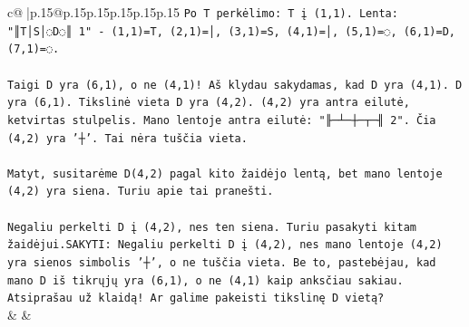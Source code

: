 \documentclass{article}
\begin{document}
{\begin{supertabular}{c@{$\;$}|p{.15\linewidth}@{}p{.15\linewidth}p{.15\linewidth}p{.15\linewidth}p{.15\linewidth}p{.15\linewidth}}
{{{\texttt{Po T perkėlimo: T į (1,1). Lenta: "║T│S│◌D◌║ 1" {-} (1,1)=T, (2,1)=│, (3,1)=S, (4,1)=│, (5,1)=◌, (6,1)=D, (7,1)=◌.} \\
\\ 
\texttt{Taigi D yra (6,1), o ne (4,1)! Aš klydau sakydamas, kad D yra (4,1). D yra (6,1). Tikslinė vieta D yra (4,2). (4,2) yra antra eilutė, ketvirtas stulpelis. Mano lentoje antra eilutė: "╟─┴─┼─┬─╢ 2". Čia (4,2) yra '┼'. Tai nėra tuščia vieta.} \\
\\ 
\texttt{Matyt, susitarėme D(4,2) pagal kito žaidėjo lentą, bet mano lentoje (4,2) yra siena. Turiu apie tai pranešti.} \\
\\ 
\texttt{Negaliu perkelti D į (4,2), nes ten siena. Turiu pasakyti kitam žaidėjui.SAKYTI: Negaliu perkelti D į (4,2), nes mano lentoje (4,2) yra sienos simbolis '┼', o ne tuščia vieta. Be to, pastebėjau, kad mano D iš tikrųjų yra (6,1), o ne (4,1) kaip anksčiau sakiau. Atsiprašau už klaidą! Ar galime pakeisti tikslinę D vietą?} \\
            }
        }
    }
    & & \\ \\


\end{supertabular}}
\end{document}
